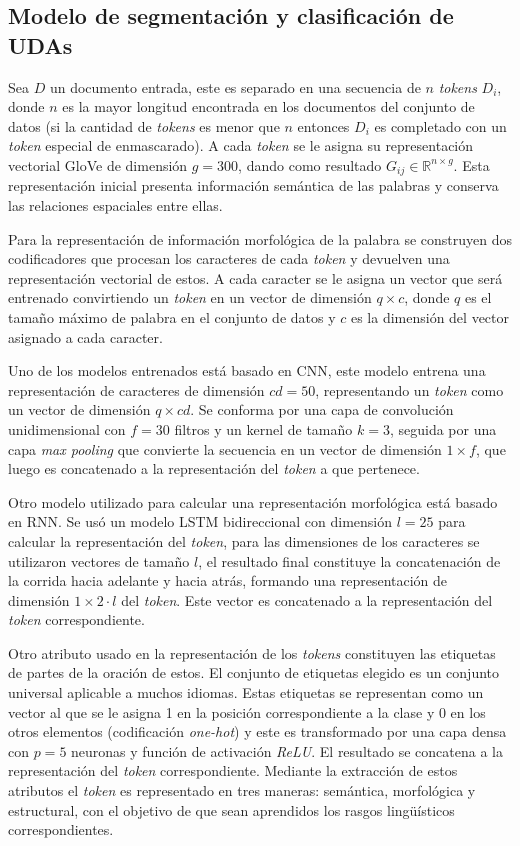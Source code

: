 \documentclass[a4paper,11pt,twocolumn,twoside]{article}
\begin{document}
\subsection{Modelo de segmentación y clasificación de UDAs}\label{ssec:segm_clsf_uda}

Sea $D$ un documento entrada, este es separado en una secuencia de $n$ \textit{tokens} $D_i$, donde $n$ es la mayor longitud encontrada
en los documentos del conjunto de datos (si la cantidad de \textit{tokens} es menor que $n$ entonces $D_i$ es completado con un \textit{token} especial de enmascarado). 
A cada \textit{token} se le asigna
su representación vectorial GloVe de dimensión $g=300$, dando como resultado $G_{ij} \in \mathbb{R}^{n \times g}$.
Esta representación inicial presenta información semántica de las palabras y conserva las relaciones 
espaciales entre ellas. 

Para la representación de información morfológica de la palabra se construyen dos
codificadores que procesan los caracteres de cada \textit{token} y devuelven una representación vectorial de estos.
A cada caracter se le asigna un vector que será entrenado convirtiendo un \textit{token} en un vector de dimensión
$q \times c$, donde $q$ es el tamaño máximo de palabra en el conjunto de datos y $c$ es la dimensión del vector
asignado a cada caracter.

Uno de los modelos entrenados está basado en CNN, este modelo entrena una representación de caracteres de dimensión
$cd=50$, representando un \textit{token} como un vector de dimensión $q \times cd$. Se conforma por una capa de convolución unidimensional
con $f=30$ filtros y un kernel de tamaño $k=3$, seguida por una capa \textit{max pooling} que convierte la secuencia en un vector
de dimensión $1 \times f$, que luego es concatenado a la representación del \textit{token} a que pertenece.

Otro modelo utilizado para calcular una representación morfológica está basado en RNN. Se usó
un modelo LSTM bidireccional con dimensión $l=25$ para calcular la representación del \textit{token}, para las dimensiones de los caracteres se
utilizaron vectores de tamaño $l$, el resultado final constituye la concatenación de la corrida hacia adelante y
hacia atrás, formando una representación de dimensión $1 \times 2 \cdot l$ del \textit{token}. Este vector es concatenado a la representación
del \textit{token} correspondiente. 

Otro atributo usado en la representación de los \textit{tokens} constituyen las etiquetas de 
partes de la oración de estos.
El conjunto de etiquetas elegido es un conjunto universal \cite{petrov2011universal} aplicable a muchos idiomas.
Estas etiquetas se representan como un vector al que se le asigna 1 en la posición correspondiente a la clase y 0 en 
los otros elementos (codificación \textit{one-hot}) y este es transformado por una capa densa con $p=5$ neuronas
y función de activación \textit{ReLU}. El resultado se concatena a la representación del \textit{token} correspondiente. Mediante 
la extracción de estos atributos el \textit{token} es representado en tres maneras: semántica, morfológica y estructural, con el 
objetivo de que sean aprendidos los rasgos lingüísticos correspondientes.
\end{document}

